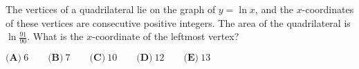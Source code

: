 The vertices of a quadrilateral lie on the graph of $y = \ln x$, and the $x$-coordinates of these vertices are consecutive positive integers. The area of the quadrilateral is $\ln \frac{91}{90}$. What is the $x$-coordinate of the leftmost vertex?

$\textbf{(A)}\ 6\qquad\textbf{(B)}\ 7\qquad\textbf{(C)}\ 10\qquad\textbf{(D)}\ 12\qquad\textbf{(E)}\ 13$